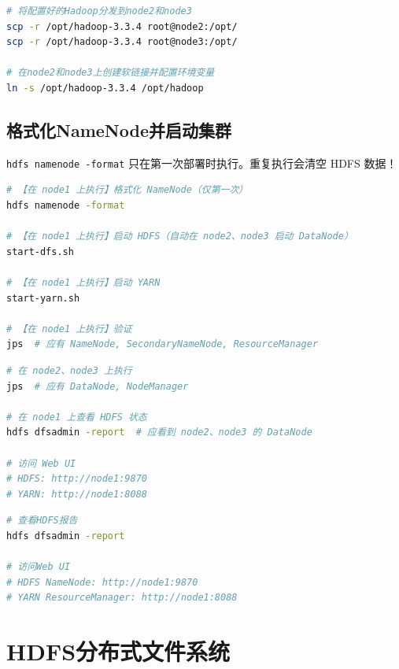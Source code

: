 \documentclass[12pt,a4paper]{article}
\begin{document}
\begin{lstlisting}[language=bash]
# 将配置好的Hadoop分发到node2和node3
scp -r /opt/hadoop-3.3.4 root@node2:/opt/
scp -r /opt/hadoop-3.3.4 root@node3:/opt/

# 在node2和node3上创建软链接并配置环境变量
ln -s /opt/hadoop-3.3.4 /opt/hadoop
\end{lstlisting}

\subsection{格式化NameNode并启动集群}

\begin{warnbox}[格式化只会执行一次]
\texttt{hdfs namenode -format} 只在第一次部署时执行。重复执行会清空 HDFS 数据！
\end{warnbox}

\begin{lstlisting}[language=bash]
# 【在 node1 上执行】格式化 NameNode（仅第一次）
hdfs namenode -format

# 【在 node1 上执行】启动 HDFS（自动在 node2、node3 启动 DataNode）
start-dfs.sh

# 【在 node1 上执行】启动 YARN
start-yarn.sh

# 【在 node1 上执行】验证
jps  # 应有 NameNode, SecondaryNameNode, ResourceManager
\end{lstlisting}

\begin{tipbox}[启动后必做的验证]
\begin{lstlisting}[language=bash]
# 在 node2、node3 上执行
jps  # 应有 DataNode, NodeManager

# 在 node1 上查看 HDFS 状态
hdfs dfsadmin -report  # 应看到 node2、node3 的 DataNode

# 访问 Web UI
# HDFS: http://node1:9870
# YARN: http://node1:8088
\end{lstlisting}
\end{tipbox}

\begin{tipbox}[验证Hadoop集群]
\begin{lstlisting}[language=bash]
# 查看HDFS报告
hdfs dfsadmin -report

# 访问Web UI
# HDFS NameNode: http://node1:9870
# YARN ResourceManager: http://node1:8088
\end{lstlisting}
\end{tipbox}

\section{HDFS分布式文件系统}
\end{document}
